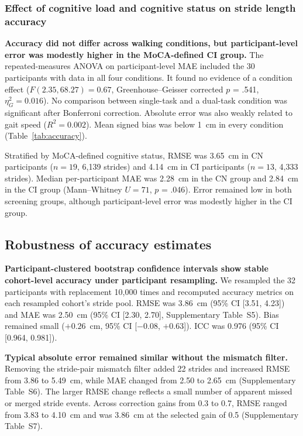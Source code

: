 \documentclass[11pt]{article}
\begin{document}
\FloatBarrier
\subsubsection{Effect of cognitive load and cognitive status on stride length accuracy}

\textbf{Accuracy did not differ across walking conditions, but participant-level error was modestly higher in the MoCA-defined CI group.}
The repeated-measures ANOVA on participant-level MAE included the 30 participants with data in all four conditions. It found no evidence of a condition effect ($F(2.35, 68.27) = 0.67$, Greenhouse--Geisser corrected $p$ = .541, $\eta^2_G = 0.016$). No comparison between single-task and a dual-task condition was significant after Bonferroni correction. Absolute error was also weakly related to gait speed ($R^2 = 0.002$). Mean signed bias was below 1~cm in every condition (Table~\ref{tab:accuracy}).

Stratified by MoCA-defined cognitive status, RMSE was 3.65~cm in CN participants ($n = 19$, 6{,}139 strides) and 4.14~cm in CI participants ($n = 13$, 4{,}333 strides). Median per-participant MAE was 2.28~cm in the CN group and 2.84~cm in the CI group (Mann--Whitney $U = 71$, $p$ = .046). Error remained low in both screening groups, although participant-level error was modestly higher in the CI group.

\subsection{Robustness of accuracy estimates}\label{sec:robustness}

\textbf{Participant-clustered bootstrap confidence intervals show stable cohort-level accuracy under participant resampling.}
We resampled the 32 participants with replacement 10{,}000 times and recomputed accuracy metrics on each resampled cohort's stride pool. RMSE was 3.86~cm (95\% CI [3.51, 4.23]) and MAE was 2.50~cm (95\% CI [2.30, 2.70], Supplementary Table~S5). Bias remained small ($+0.26$~cm, 95\% CI [$-0.08$, $+0.63$]). ICC was 0.976 (95\% CI [0.964, 0.981]).

\textbf{Typical absolute error remained similar without the mismatch filter.} Removing the stride-pair mismatch filter added 22 strides and increased RMSE from 3.86 to 5.49~cm, while MAE changed from 2.50 to 2.65~cm (Supplementary Table~S6). The larger RMSE change reflects a small number of apparent missed or merged stride events. Across correction gains from 0.3 to 0.7, RMSE ranged from 3.83 to 4.10~cm and was 3.86~cm at the selected gain of 0.5 (Supplementary Table~S7).
\end{document}
